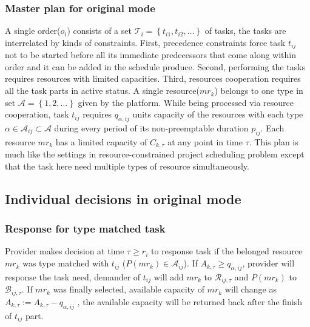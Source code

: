 \subsubsection{Master plan for original mode} %
\label{ssub:master_plam}
A single order($o_i$) consists of a set $\mathcal{T}_i = \left\{ t_{i1},t_{i2},\dots\right\}$ of tasks, the tasks are interrelated by kinds of constraints. First, precedence constraints force task $t_{ij}$ not to be started before all its immediate predecessors that come along within order and it can be added in the schedule produce. Second, performing the tasks requires resources with limited capacities. Third, resources cooperation requires all the task parts in active status.
A single resource($mr_k$) belongs to one type in set $\mathcal{A} = \left\{1,2,\dots\right\}$ given by the platform. While being processed via resource cooperation, task $t_{ij}$ requires $q_{\alpha,ij}$ units capacity of the resources with each type $\alpha\in\mathcal{A}_{ij}\subset\mathcal{A}$ during every period of its non-preemptable duration $p_{ij}$. Each resource $mr_k$ has a limited capacity of $C_{k,\tau}$ at any point in time $\tau$. This plan is much like the settings in resource-constrained project scheduling problem\cite{Kolisch1999} except that the task here need multiple types of resource simultaneously.

\subsection{Individual decisions in original mode} %
\label{sub:interactions_and_decisions}
\subsubsection{Response for type matched task}
\label{subs:Response_for_type_matched_task}
Provider makes decision at time $\tau\ge r_i$ to response task if the belonged resource $mr_k$ was type matched with $t_{ij}$ ($P(mr_k)\in\mathcal{A}_{ij}$). If $A_{k,\tau} \ge q_{\alpha,ij}$, provider will response the task need, demander of $t_{ij}$ will add $mr_k$ to $\mathcal{R}_{ij,\tau}$ and $P(mr_k)$ to $\mathcal{B}_{ij,\tau}$. If $mr_k$ was finally selected, available capacity of $mr_k$ will change as $A_{k,\tau}:= A_{k,\tau} - q_{\alpha,ij}$ , the available capacity will be returned back after the finish of $t_{ij}$ part.


